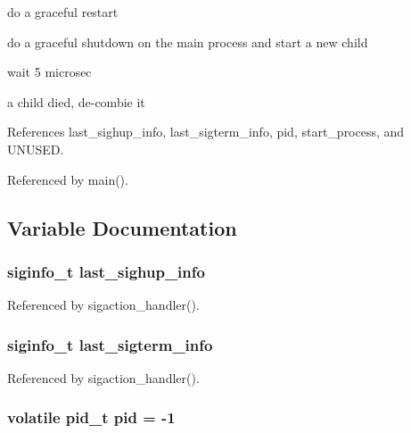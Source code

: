 do a graceful restart

do a graceful shutdown on the main process and start a new child

wait 5 microsec

a child died, de-\/combie it 

References last\-\_\-sighup\-\_\-info, last\-\_\-sigterm\-\_\-info, pid, start\-\_\-process, and U\-N\-U\-S\-E\-D.



Referenced by main().



\subsection{Variable Documentation}
\hypertarget{lighttpd-angel_8c_aa06fffa391286db054a0d51ae94096b2}{
\subsubsection[{last\-\_\-sighup\-\_\-info}]{\setlength{\rightskip}{0pt plus 5cm}siginfo\-\_\-t last\-\_\-sighup\-\_\-info\hspace{0.3cm}{\ttfamily [static]}}}\label{lighttpd-angel_8c_aa06fffa391286db054a0d51ae94096b2}


Referenced by sigaction\-\_\-handler().

\hypertarget{lighttpd-angel_8c_a5afc1a3d202d014401a370df440c52d0}{
\subsubsection[{last\-\_\-sigterm\-\_\-info}]{\setlength{\rightskip}{0pt plus 5cm}siginfo\-\_\-t last\-\_\-sigterm\-\_\-info\hspace{0.3cm}{\ttfamily [static]}}}\label{lighttpd-angel_8c_a5afc1a3d202d014401a370df440c52d0}


Referenced by sigaction\-\_\-handler().

\hypertarget{lighttpd-angel_8c_a621c8fc233a319aebb077fe9a9665251}{
\subsubsection[{pid}]{\setlength{\rightskip}{0pt plus 5cm}volatile pid\-\_\-t pid = -\/1\hspace{0.3cm}{\ttfamily [static]}}}\label{lighttpd-angel_8c_a621c8fc233a319aebb077fe9a9665251}


